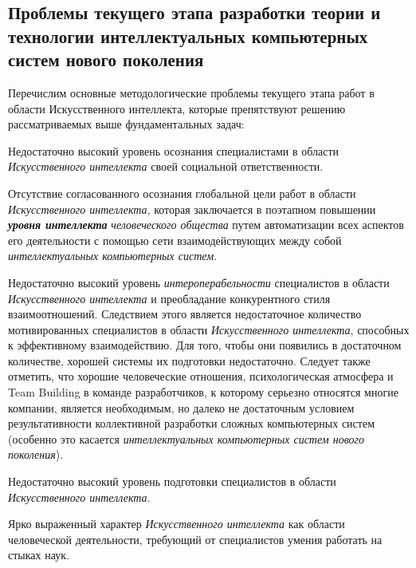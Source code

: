 \subsection*{Проблемы текущего этапа разработки теории и технологии интеллектуальных компьютерных систем нового поколения}
Перечислим основные методологические проблемы текущего этапа работ в области Искусственного интеллекта, которые препятствуют решению рассматриваемых выше фундаментальных задач:
\begin{textitemize}
	\item 
	Недостаточно высокий уровень осознания специалистами в области \textit{Искусственного интеллекта} своей социальной ответственности.
	
	\item 
	Отсутствие согласованного осознания глобальной цели работ в области \textit{Искусственного интеллекта}, которая заключается в поэтапном повышении \textbf{\textit{уровня интеллекта}} \textit{человеческого общества} путем  автоматизации всех аспектов его деятельности с помощью сети взаимодействующих между собой \textit{интеллектуальных компьютерных систем}.
	
	\item 
	Недостаточно высокий уровень \textit{интероперабельности} специалистов в области \textit{Искусственного интеллекта} и преобладание конкурентного стиля взаимоотношений. Следствием этого является недостаточное количество мотивированных специалистов в области \textit{Искусственного интеллекта}, способных к эффективному  взаимодействию. Для того, чтобы они появились в достаточном количестве, хорошей системы их  подготовки недостаточно. Следует также отметить, что хорошие человеческие отношения, психологическая атмосфера и Team Building в команде разработчиков, к которому серьезно относятся многие компании, является необходимым, но далеко не достаточным условием результативности коллективной разработки сложных компьютерных систем (особенно это касается \textit{интеллектуальных компьютерных систем нового поколения}).
	
	\item 
	Недостаточно высокий уровень  подготовки специалистов в области \textit{Искусственного интеллекта}.
	
	\item 
	Ярко выраженный  характер \textit{Искусственного интеллекта} как области человеческой деятельности, требующий от специалистов умения работать на стыках наук.
	

\end{textitemize}
